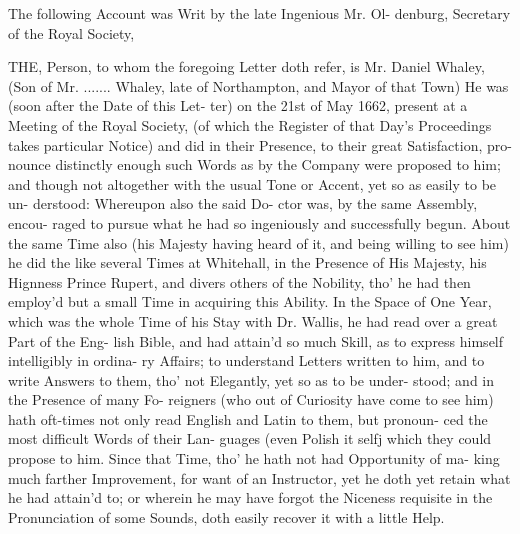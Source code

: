 The following Account was Writ
by the late Ingenious Mr. Ol-
denburg, Secretary of the
Royal Society,

THE, Person, to whom the foregoing
Letter doth refer, is Mr. Daniel
Whaley, (Son of Mr. ....... Whaley, late
of Northampton, and Mayor of that Town)
He was (soon after the Date of this Let-
ter) on the 21st of May 1662, present at
a Meeting of the Royal Society, (of which
the Register of that Day's Proceedings
takes particular Notice) and did in their
Presence, to their great Satisfaction, pro-
nounce distinctly enough such Words as
by the Company were proposed to him;
and though not altogether with the usual
Tone or Accent, yet so as easily to be un-
derstood: Whereupon also the said Do-
ctor was, by the same Assembly, encou-
raged to pursue what he had so ingeniously
and successfully begun. About the same
Time also (his Majesty having heard of
it, and being willing to see him) he did
the like several Times at Whitehall, in the
Presence of His Majesty, his Hignness
Prince Rupert, and divers others of the
Nobility, tho' he had then employ'd but a
small Time in acquiring this Ability. In
the Space of One Year, which was the
whole Time of his Stay with Dr. Wallis,
he had read over a great Part of the Eng-
lish Bible, and had attain'd so much Skill,
as to express himself intelligibly in ordina-
ry Affairs; to understand Letters written
to him, and to write Answers to them,
tho' not Elegantly, yet so as to be under-
stood; and in the Presence of many Fo-
reigners (who out of Curiosity have come
to see him) hath oft-times not only read
English and Latin to them, but pronoun-
ced the most difficult Words of their Lan-
guages (even Polish it selfj which they
could propose to him. Since that Time,
tho' he hath not had Opportunity of ma-
king much farther Improvement, for want
of an Instructor, yet he doth yet retain
what he had attain'd to; or wherein he
may have forgot the Niceness requisite in
the Pronunciation of some Sounds, doth
easily recover it with a little Help.

